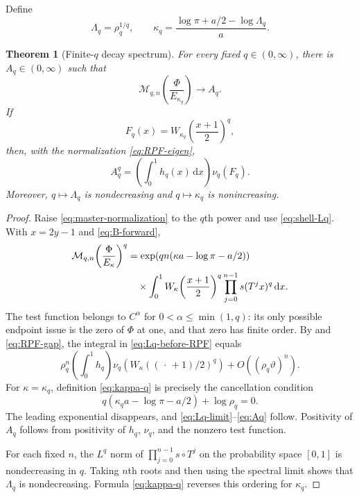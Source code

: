 \documentclass[11pt,oneside]{article}
\numberwithin{equation}{section}
\newtheorem{theorem}{Theorem}[section]
\theoremstyle{definition}
\theoremstyle{remark}
\newcommand{\dd}{\,\mathrm d}
\newcommand{\PhiUp}{\Phi}
\begin{document}
Define
\begin{equation}
 \Lambda_q=\rho_q^{1/q},
 \qquad
 \kappa_q=\frac{\log\pi+a/2-\log\Lambda_q}{a}.
 \label{eq:kappa-q}
\end{equation}

\begin{theorem}[Finite-\(q\) decay spectrum]
\label{thm:Lq-spectrum}
For every fixed \(q\in(0,\infty)\), there is \(A_q\in(0,\infty)\) such that
\begin{equation}
 \mathcal M_{q,n}\!\left(\frac{\PhiUp}{E_{\kappa_q}}\right)
 \longrightarrow A_q.
 \label{eq:Lq-limit}
\end{equation}
If
\begin{equation}
 F_q(x)=W_{\kappa_q}\!\left(\frac{x+1}{2}\right)^q,
 \label{eq:Fq}
\end{equation}
then, with the normalization \eqref{eq:RPF-eigen},
\begin{equation}
 A_q^q=\left(\int_0^1h_q(x)\dd x\right)\nu_q(F_q).
 \label{eq:Aq}
\end{equation}
Moreover, \(q\mapsto\Lambda_q\) is nondecreasing and \(q\mapsto\kappa_q\) is
nonincreasing.
\end{theorem}

\begin{proof}
Raise \eqref{eq:master-normalization} to the \(q\)th power and use
\eqref{eq:shell-Lq}.  With \(x=2y-1\) and \eqref{eq:B-forward},
\begin{align}
 \mathcal M_{q,n}\!\left(\frac{\PhiUp}{E_\kappa}\right)^q
 &=\exp\!\left(qn(\kappa a-\log\pi-a/2)\right)\notag\\
 &\quad\times\int_0^1
 W_\kappa\!\left(\frac{x+1}{2}\right)^q
 \prod_{j=0}^{n-1}s(T^jx)^q\dd x.
 \label{eq:Lq-before-RPF}
\end{align}
The test function belongs to \(C^\alpha\) for
\(0<\alpha\le\min(1,q)\): its only possible endpoint issue is the zero of \(\PhiUp\) at
one, and that zero has finite order.  By  and
\eqref{eq:RPF-gap}, the integral in \eqref{eq:Lq-before-RPF} equals
\[
 \rho_q^n\left(\int_0^1h_q\right)
 \nu_q\!\left(W_\kappa((\,\cdot\,+1)/2)^q\right)
 +O((\rho_q\vartheta)^n).
\]
For \(\kappa=\kappa_q\), definition \eqref{eq:kappa-q} is precisely the cancellation
condition
\[
 q(\kappa_qa-\log\pi-a/2)+\log\rho_q=0.
\]
The leading exponential disappears, and \eqref{eq:Lq-limit}--\eqref{eq:Aq} follow.
Positivity of \(A_q\) follows from positivity of \(h_q\), \(\nu_q\), and the nonzero test
function.

For each fixed \(n\), the \(L^q\) norm of
\(\prod_{j=0}^{n-1}s\circ T^j\) on the probability space \([0,1]\) is nondecreasing in
\(q\).  Taking \(n\)th roots and then using the spectral limit shows that
\(\Lambda_q\) is nondecreasing.  Formula \eqref{eq:kappa-q} reverses this ordering for
\(\kappa_q\).
\end{proof}
\end{document}
